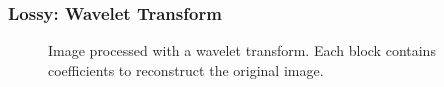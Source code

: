 \documentclass{beamer}
\begin{document}
\begin{frame}
   \frametitle{Lossy: Wavelet Transform}
   \pause
   \begin{figure}[!htbp]
   \begin{center}
   \caption{Image processed with a wavelet transform. Each block contains coefficients to reconstruct the original image.}
   \end{center}
   \end{figure}
\end{frame}
\end{document}
